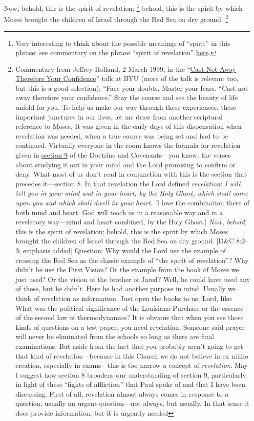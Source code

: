 		Now, behold, this is the spirit	of revelation;%
			\footnote{%
				Very interesting to think about the possible meanings of ``spirit'' in this phrase; see commentary on the phrase ``spirit of revelation'' \hyperref[SPIRIT-PHRASES]{here}.
				}
		behold, this is the spirit by which Moses brought the children of Israel through the Red Sea on dry ground.%
			\footnote{%
				Commentary from Jeffrey Holland, 2 March 1999, in the ``\href{https://speeches.byu.edu/talks/jeffrey-r-holland/cast-not-away-therefore-your-confidence/}{Cast Not Away Therefore Your Confidence}'' talk at BYU (more of the talk is relevant too, but this is a good selection): ``Face your doubts. Master your fears. ``Cast not away therefore your confidence.'' Stay the course and see the beauty of life unfold for you. To help us make our way through these experiences, these important junctures in our lives, let me draw from another scriptural reference to Moses. It was given in the early days of this dispensation when revelation was needed, when a true course was being set and had to be continued. Virtually everyone in the room knows the formula for revelation given in \hyperref[DC9]{section 9} of the Doctrine and Covenants---you know, the verses about studying it out in your mind and the Lord promising to confirm or deny. What most of us don't read in conjunction with this is the section that precedes it---section 8. In that revelation the Lord defined \textit{revelation}: \textit{I will tell you in your mind and in your heart, by the Holy Ghost, which shall come upon you and which shall dwell in your heart.} [I love the combination there of both mind and heart. God will teach us in a reasonable way and in a revelatory way---mind and heart combined, by the Holy Ghost.] \textit{Now, behold,} this is the spirit of revelation; behold, this is the spirit by which Moses brought the children of Israel through the Red Sea on dry ground. [D\&C 8:2--3; emphasis added] Question: Why would the Lord use the example of crossing the Red Sea as the classic example of ``the spirit of revelation''? Why didn't he use the First Vision? Or the example from the book of Moses we just used? Or the vision of the brother of Jared? Well, he could have used any of these, but he didn't. Here he had another purpose in mind. Usually we think of revelation as information. Just open the books to us, Lord, like: What was the political significance of the Louisiana Purchase or the essence of the second law of thermodynamics? It is obvious that when you see those kinds of questions on a test paper, you need revelation. Someone said prayer will never be eliminated from the schools so long as there are final examinations. But aside from the fact that you probably aren't going to get that kind of revelation---because in this Church we do not believe in ex nihilo creation, especially in exams---this is too narrow a concept of \textit{revelation}. May I suggest how section 8 broadens our understanding of section 9, particularly in light of these ``fights of affliction'' that Paul spoke of and that I have been discussing. First of all, revelation almost always comes in response to a question, usually an urgent question---not always, but usually. In that sense it does provide information, but it is urgently needed }
